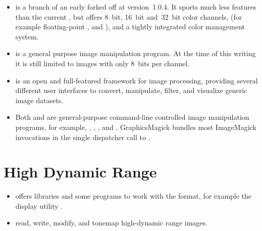 \begin{itemize}
\item\label{app:cinepaint}
   is
  a branch of an early  forked off at version~1.0.4.
  It sports much less features than the current ,
  but offers 8~bit, 16~bit and~32~bit color channels, 
  (for example floating-point , and ),
  and a tightly integrated color management system.

\item\label{app:gimp}  is a general purpose image manipulation
  program.  At the time of this writing it is still limited to images
  with only 8~bits per channel.

\item\label{app:gmic}
   is
  an open and full-featured framework for image processing, providing
  several different user interfaces to convert, manipulate, filter,
  and visualize generic image datasets.

\item\label{app:imagemagick} Both
   and
   are
  general\hyp{}purpose command\hyp{}line controlled image manipulation
  programs, for example, , , , and . GraphicsMagick bundles most ImageMagick
  invocations in the single dispatcher call to .
\end{itemize}


\section[High Dynamic Range]{High Dynamic Range
  \label{sec:high-dynamic-range}
  }

\begin{itemize}
\item\label{lib:openexr}  offers libraries
  and some programs to work with the  
  format, for example the  display utility
  .

\item\label{app:psftools}
   read, write,
  modify, and tonemap high-dynamic range images.
\end{itemize}


